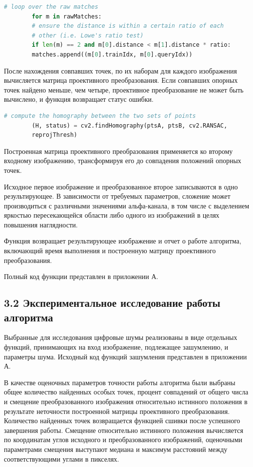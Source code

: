 {{{{\begin{lstlisting}[frame=single,language=Python,mathescape=true]
   		# loop over the raw matches
   		for m in rawMatches:
   		# ensure the distance is within a certain ratio of each
   		# other (i.e. Lowe's ratio test)
   		if len(m) == 2 and m[0].distance < m[1].distance * ratio:
   		matches.append((m[0].trainIdx, m[0].queryIdx))
   		\end{lstlisting}
   		
   		После нахождения совпавших точек, по их наборам для каждого изображения вычисляется матрица проективного преобразования.
   		Если совпавших опорных точек найдено меньше, чем четыре, проективное преобразование не может быть вычислено, и функция возвращает статус ошибки.
   		
   		\begin{lstlisting}[frame=single,language=Python,mathescape=true]
   		 # compute the homography between the two sets of points
   		(H, status) = cv2.findHomography(ptsA, ptsB, cv2.RANSAC,
   		reprojThresh)
   		\end{lstlisting}
   		
   		Построенная матрица проективного преобразования применяется ко второму входному изображению, трансформируя его до совпадения положений опорных точек.
   		
   		Исходное первое изображение и преобразованное второе записываются в одно результирующее. В зависимости от требуемых параметров, сложение может производиться с различными значениями альфа-канала, в том числе с выделением яркостью пересекающейся области либо одного из изображений в целях повышения наглядности.
   		
   		Функция возвращает результирующее изображение и отчет о работе алгоритма, включающий время выполнения и построенную матрицу проективного преобразования.
   		
   		Полный код функции представлен в приложении А.
   	}
   
   	\newpage
   	\subsection*{3.2 \quad Экспериментальное исследование работы алгоритма}{
   		Выбранные для исследования цифровые шумы реализованы в виде отдельных функций, принимающих на вход изображение, подлежащее зашумлению, и параметры шума. Исходный код функций зашумления представлен в приложении А.
   		
   		В качестве оценочных параметров точности работы алгоритма были выбраны общее количество найденных особых точек, процент совпадений от общего числа и смещение преобразованного изображения относительно истинного положения в результате неточности построенной матрицы проективного преобразования.
   		Количество найденных точек возвращается функцией сшивки после успешного завершения работы. Смещение относительно истинного положения вычисляется по координатам углов исходного и преобразованного изображений, оценочными параметрами смещения выступают медиана и максимум расстояний между соответствующими углами в пикселях. 
   		
}}}}
